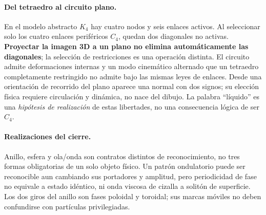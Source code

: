 \documentclass[11pt,a4paper]{article}
\theoremstyle{definition}\newtheorem{defi}[teo]{Definición}
\begin{document}
\paragraph{Del tetraedro al circuito plano.} En el modelo abstracto $K_4$ hay cuatro nodos y seis enlaces activos. Al seleccionar solo los cuatro enlaces periféricos $C_4$, quedan dos diagonales no activas. \textbf{Proyectar la imagen 3D a un plano no elimina automáticamente las diagonales}; la selección de restricciones es una operación distinta. El circuito admite deformaciones internas y un modo cinemático alternado que un tetraedro completamente restringido no admite bajo las mismas leyes de enlaces. Desde una orientación de recorrido del plano aparece una normal con dos signos; su elección física requiere circulación y dinámica, no nace del dibujo. La palabra ``líquido'' es una \emph{hipótesis de realización} de estas libertades, no una consecuencia lógica de ser $C_4$.

\paragraph{Realizaciones del cierre.} Anillo, esfera y ola/onda son contratos distintos de reconocimiento, no tres formas obligatorias de un solo objeto físico. Un patrón ondulatorio puede ser reconocible aun cambiando sus portadores y amplitud, pero periodicidad de fase no equivale a estado idéntico, ni onda viscosa de cizalla a solitón de superficie. Los dos giros del anillo son fases poloidal y toroidal; sus marcas móviles no deben confundirse con partículas privilegiadas.
\end{document}
